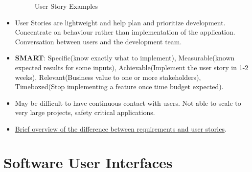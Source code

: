 \documentclass[a4paper]{article}
\begin{document}
\begin{itemize}
\begin{figure}[H]
\begin{subfigure}[b]{0.45\textwidth}
        \end{subfigure}
        \caption{User Story Examples}
        \label{fig:SE-user-stories}
    \end{figure}
    \item User Stories are lightweight and help plan and prioritize development. Concentrate on behaviour rather than implementation of the application. Conversation between users and the development team.
    \item \textbf{SMART}: Specific(know exactly what to implement), Measurable(known expected results for some inputs), Achievable(Implement the user story in 1-2 weeks), Relevant(Business value to one or more stakeholders), Timeboxed(Stop implementing a feature once time budget expected).
    \item May be difficult to have continuous contact with users. Not able to scale to very large projects, safety critical applications.
    \item \href{https://www.youtube.com/watch?v=KP0U3I-f9-Y}{Brief overview of the difference between requirements and user stories}.
\end{itemize}

\section{Software User Interfaces}
\end{document}
